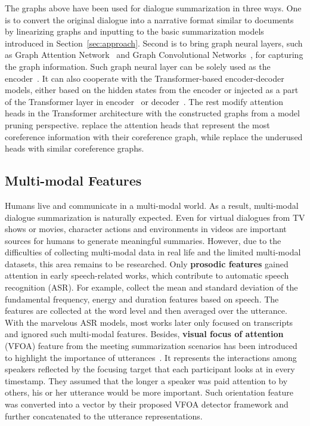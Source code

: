 The graphs above have been used for dialogue summarization in three ways. One is to convert the original dialogue into a narrative format similar to documents by linearizing graphs and inputting to the basic summarization models~\cite{fabbri2021convosumm,ganesh2019restructuring} introduced in Section~\ref{sec:approach}.
Second is to bring graph neural layers, such as Graph Attention Network~\cite{velivckovic2018graph} and Graph Convolutional Networks~\cite{kipf2016semi}, for capturing the graph information. Such graph neural layer can be solely used as the encoder~\cite{feng2021incorporating}. It can also cooperate with the Transformer-based encoder-decoder models, either based on the hidden states from the encoder or injected as a part of the Transformer layer in encoder~\cite{liu2021coreference} or decoder~\cite{chen2021structure}.
The rest modify attention heads in the Transformer architecture with the constructed graphs from a model pruning perspective. \citet{liu2021coreference} replace the attention heads that represent the most coreference information with their coreference graph, while \citet{liu2023picking} replace the underused heads with similar coreference graphs.




\subsection{Multi-modal Features}

Humans live and communicate in a multi-modal world. As a result, multi-modal dialogue summarization is naturally expected. Even for virtual dialogues from TV shows or movies, character actions and environments in videos are important sources for humans to generate meaningful summaries. However, due to the difficulties of collecting multi-modal data in real life and the limited multi-modal datasets, this area remains to be researched. Only 
\textbf{prosodic features} gained attention in early speech-related works, which contribute to automatic speech recognition (ASR). For example, 
\citet{murray2005extractive} collect the mean and standard deviation of the fundamental frequency, energy and duration features based on speech. The features are collected at the word level and then averaged over the utterance.
With the marvelous ASR models, most works later only focused on transcripts and ignored such multi-modal features.
Besides, \textbf{visual focus of 
attention} {(VFOA)} feature from the meeting summarization scenarios 
has been introduced to highlight the importance of utterances~\cite{li2019keep}. 
It represents the interactions among speakers reflected by the focusing target that each participant looks at in every timestamp. They assumed that the longer a speaker was paid attention to by others, his or her utterance would be more important. Such orientation feature was converted into a vector by their proposed VFOA detector framework and further concatenated to the utterance representations. %

